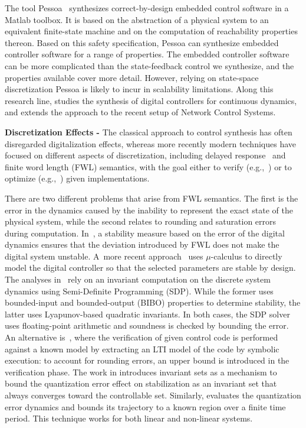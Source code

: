 \documentclass[twocolumn]{autart}    %
\begin{document}
The tool Pessoa~\cite{mazo2010pessoa} synthesizes correct-by-design embedded
control software in a Matlab toolbox.  It is based on the abstraction of a
physical system to an equivalent finite-state machine and on the computation
of reachability properties thereon.  Based on this safety specification,
\mbox{Pessoa} can synthesize embedded controller software for a range of
properties.  The embedded controller software can be more complicated than
the state-feedback control we synthesize, and the properties available cover
more detail.  However, relying on state-space discretization \mbox{Pessoa}
is likely to incur in scalability limitations.  Along this research line,
\cite{Anta2010,liu16} studies the synthesis of digital controllers for
continuous dynamics, and \cite{zamani2014} extends the approach to the
recent setup of Network Control Systems.

\textbf{Discretization Effects -}
The classical approach to control synthesis has often disregarded
digitalization effects, whereas more recently modern techniques have focused
on different aspects of discretization, including delayed
response~\cite{Duggirala2015} and finite word length (FWL) semantics, with
the goal either to verify (e.g.,~\cite{daes20161}) or to optimize
(e.g.,~\cite{oudjida2014design}) given implementations.

There are two different problems that arise from FWL semantics.  The first
is the error in the dynamics caused by the inability to represent the exact
state of the physical system, while the second relates to rounding and
saturation errors during computation.  In~\cite{fialho1994stability}, a
stability measure based on the error of the digital dynamics ensures that
the deviation introduced by FWL does not make the digital system unstable. 
A~more recent approach~\cite{DBLP:journals/automatica/WuLCC09} uses
$\mu$-calculus to directly model the digital controller so that the selected
parameters are stable by design.  The analyses
in~\cite{DBLP:conf/hybrid/RouxJG15, DBLP:conf/hybrid/WangGRJF16} rely on an
invariant computation on the discrete system dynamics using Semi-Definite
Programming (SDP).  While the former uses bounded-input and bounded-output
(BIBO) properties to determine stability, the latter uses Lyapunov-based
quadratic invariants.  In both cases, the SDP solver uses floating-point
arithmetic and soundness is checked by bounding the error.  An alternative
is~\cite{park2016scalable}, where the verification of given control code is
performed against a known model by extracting an LTI model of the code by
symbolic execution: to account for rounding errors, an upper bound is
introduced in the verification phase.  The work in
\cite{picasso2003stabilization} introduces invariant sets as a mechanism to
bound the quantization error effect on stabilization as an invariant set
that always converges toward the controllable set.  Similarly,
\cite{liberzon2003hybrid} evaluates the quantization error dynamics and
bounds its trajectory to a known region over a finite time period.  This
technique works for both linear and non-linear systems.
\end{document}
